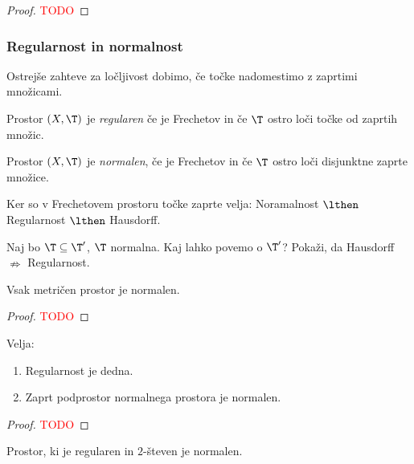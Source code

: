 \begin{proof}
    \textcolor{red}{TODO}
\end{proof}

\subsubsection{Regularnost in normalnost}
Ostrejše zahteve za ločljivost dobimo, če točke nadomestimo z zaprtimi množicami.
\begin{definicija}
    Prostor $(X, \T)$ je \emph{regularen} če je Frechetov in če $\T$ ostro loči točke od zaprtih množic.
\end{definicija}

\begin{definicija}
    Prostor $(X, \T)$ je \emph{normalen}, če je Frechetov in če $\T$ ostro loči disjunktne zaprte množice.
\end{definicija}

\begin{opomba}
    Ker so v Frechetovem prostoru točke zaprte velja: Noramalnost $\lthen$ Regularnost $\lthen$ Hausdorff.
\end{opomba}

\begin{primer}
    Naj bo $\T \subseteq \T'$, $\T$ normalna. Kaj lahko povemo o $\T'$?    Pokaži, da Hausdorff $\nRightarrow$ Regularnost.
\end{primer}

\begin{trditev}
    Vsak metričen prostor je normalen.
\end{trditev}

\begin{proof}
    \textcolor{red}{TODO}
\end{proof}

\begin{trditev}
    Velja:
    \begin{enumerate}
        \item Regularnost je dedna.
        \item Zaprt podprostor normalnega prostora je normalen.
    \end{enumerate}    
\end{trditev}

\begin{proof}
    \textcolor{red}{TODO}
\end{proof}

\begin{izrek}
    Prostor, ki je regularen in $2$-števen je normalen.
\end{izrek}

